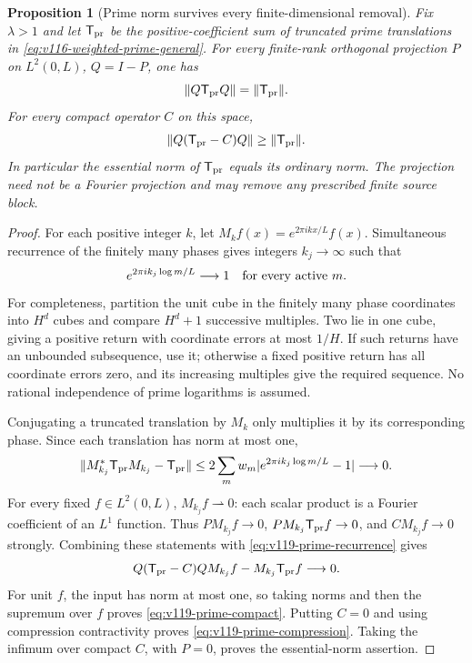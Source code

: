 \documentclass[11pt]{article}
\newtheorem{proposition}[theorem]{Proposition}
\theoremstyle{remark}
\begin{document}
\begin{proposition}[Prime norm survives every finite-dimensional removal]
\label{prop:v119-prime-essential}
Fix $\lambda>1$ and let $\mathsf T_{\rm pr}$ be the positive-coefficient
sum of truncated prime translations in
\eqref{eq:v116-weighted-prime-general}.  For every finite-rank
orthogonal projection $P$ on $L^2(0,L)$, $Q=I-P$, one has
\begin{equation}\label{eq:v119-prime-compression}
 \|Q\mathsf T_{\rm pr}Q\|=\|\mathsf T_{\rm pr}\|.
\end{equation}
For every compact operator $C$ on this space,
\begin{equation}\label{eq:v119-prime-compact}
 \|Q(\mathsf T_{\rm pr}-C)Q\|\ge\|\mathsf T_{\rm pr}\|.
\end{equation}
In particular the essential norm of $\mathsf T_{\rm pr}$ equals its
ordinary norm.  The projection need not be a Fourier projection and
may remove any prescribed finite source block.
\end{proposition}
\begin{proof}
For each positive integer $k$, let
$M_k f(x)=e^{2\pi ikx/L}f(x)$.  Simultaneous recurrence of the finitely
many phases gives integers $k_j\to\infty$ such that
\[
 e^{2\pi ik_j\log m/L}\longrightarrow1
 \quad\hbox{for every active }m.
\]
For completeness, partition the unit cube in the finitely many phase
coordinates into $H^d$ cubes and compare $H^d+1$ successive multiples.
Two lie in one cube, giving a positive return with coordinate errors
at most $1/H$.  If such returns have an unbounded subsequence, use it;
otherwise a fixed positive return has all coordinate errors zero,
and its increasing multiples give the required sequence.  No rational
independence of prime logarithms is assumed.

Conjugating a truncated translation by $M_k$ only multiplies it by
its corresponding phase.  Since each translation has norm at most one,
\begin{equation}\label{eq:v119-prime-recurrence}
 \|M_{k_j}^*\mathsf T_{\rm pr}M_{k_j}-\mathsf T_{\rm pr}\|
 \le2\sum_m w_m|e^{2\pi ik_j\log m/L}-1|\longrightarrow0.
\end{equation}
For every fixed $f\in L^2(0,L)$, $M_{k_j}f\rightharpoonup0$:
each scalar product is a Fourier coefficient of an $L^1$ function.
Thus $PM_{k_j}f\to0$, $PM_{k_j}\mathsf T_{\rm pr}f\to0$, and
$CM_{k_j}f\to0$ strongly.  Combining these statements with
\eqref{eq:v119-prime-recurrence} gives
\[
 Q(\mathsf T_{\rm pr}-C)Q M_{k_j}f
       -M_{k_j}\mathsf T_{\rm pr}f\longrightarrow0.
\]
For unit $f$, the input has norm at most one, so taking norms and then
the supremum over $f$ proves \eqref{eq:v119-prime-compact}.
Putting $C=0$ and using compression contractivity proves
\eqref{eq:v119-prime-compression}.  Taking the infimum over compact
$C$, with $P=0$, proves the essential-norm assertion.
\end{proof}
\end{document}
